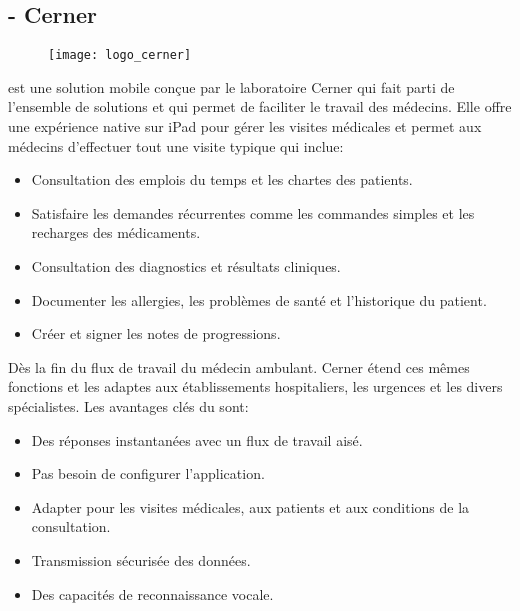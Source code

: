 \subsection{\pct{} - Cerner}

\begin{figure}[H]
\centering
\texttt{[image: logo\_cerner]}
\end{figure}

\pct{} est une solution mobile conçue par le laboratoire Cerner qui
fait parti de l'ensemble de solutions  et qui permet de
faciliter le travail des médecins. Elle offre une expérience native
sur iPad pour gérer les visites médicales et permet aux médecins
d'effectuer tout une visite typique qui inclue:~\cite{pct:flyer}

\begin{itemize}

\item Consultation des emplois du temps et les chartes des patients.

\item Satisfaire les demandes récurrentes comme les commandes simples
et les recharges des médicaments.

\item Consultation des diagnostics et résultats cliniques.

\item Documenter les allergies, les problèmes de santé et l'historique
du patient.

\item Créer et signer les notes de progressions.

\end{itemize}

Dès la fin du flux de travail du médecin ambulant. Cerner étend ces
mêmes fonctions et les adaptes aux établissements hospitaliers, les
urgences et les divers spécialistes.
Les avantages clés du \pct{} sont:~\cite{pct:flyer}

\begin{itemize}

\item Des réponses instantanées avec un flux de travail aisé.

\item Pas besoin de configurer l'application.

\item Adapter pour les visites médicales, aux patients et aux conditions
de la consultation.

\item Transmission sécurisée des données.

\item Des capacités de reconnaissance vocale.

\end{itemize}

